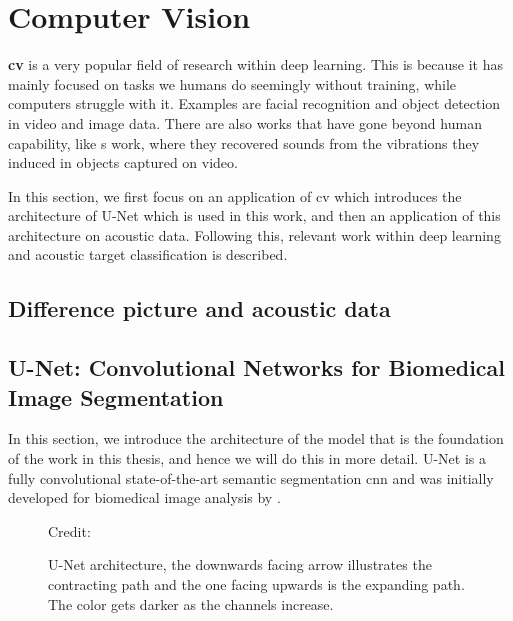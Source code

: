 \clearpage





\chapter{Computer Vision} \label{computer vision}
    \textbf{\gls{cv}} is a very popular field of research within deep learning\cite{voulodimos2018deep_computer_vision}. This is because it has mainly focused on tasks we humans do seemingly without training, while computers struggle with it. Examples are facial recognition and object detection in video and image data. There are also works that have gone beyond human capability, like \citeauthor{davis2014visual_deep_video_audio}s\cite{davis2014visual_deep_video_audio} work, where they recovered sounds from the vibrations they induced in objects captured on video. 

    
    In this section, we first focus on an application of \gls{cv} which introduces the architecture of U-Net which is used in this work, and then an application of this architecture on acoustic data. Following this, relevant work within deep learning and acoustic target classification is described. 
    
    
    
\section{Difference picture and acoustic data}
    

\section{U-Net: Convolutional Networks for Biomedical
Image Segmentation} \label{unet}

    In this section, we introduce the architecture of the model that is the foundation of the work in this thesis, and hence we will do this in more detail. U-Net is a fully convolutional state-of-the-art\cite{rajak2021segmentation} semantic segmentation \gls{cnn} and was initially developed for biomedical image analysis by \citeauthor{unet_ronneberger2015}\cite{unet_ronneberger2015}. 
    
    \begin{figure}[H]
        \centering
        
        \caption[U-Net architecture]{U-Net architecture, the downwards facing arrow illustrates the contracting path and the one facing upwards is the expanding path. The color gets darker as the channels increase.}
      	\medskip 
        \label{unet_fig}
        \hspace*{15pt}\hbox{\scriptsize Credit: \citeauthor{unet_ronneberger2015}\cite{unet_ronneberger2015}}
    \end{figure}
    
